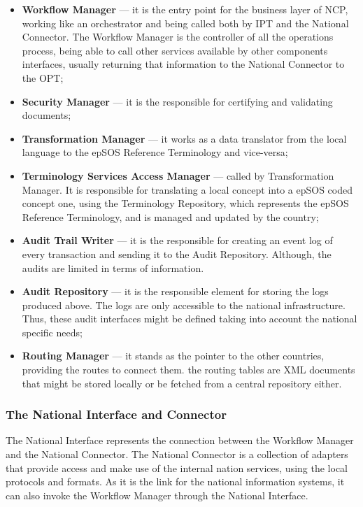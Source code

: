 \begin{itemize}
\item \textbf{Workflow Manager} --- it is the entry point for the business layer of NCP, working like an orchestrator and being called both by IPT and the National Connector. The Workflow Manager is the controller of all the operations process, being able to call other services available by other components interfaces, usually returning that information to the National Connector to the OPT;
\item \textbf{Security Manager} --- it is the responsible for certifying and validating documents;
\item \textbf{Transformation Manager} --- it works as a data translator from the local language to the epSOS Reference Terminology and vice-versa;
\item \textbf{Terminology Services Access Manager} --- called by Transformation Manager. It is responsible for translating a local concept into a epSOS coded concept one, using the Terminology Repository, which represents the epSOS Reference Terminology, and is managed and updated by the country;
\item \textbf{Audit Trail Writer} --- it is the responsible for creating an event log of every transaction and sending it to the Audit Repository. Although, the audits are limited in terms of information.
\item \textbf{Audit Repository} --- it is the responsible element for storing the logs produced above. The logs are only accessible to the national infrastructure. Thus, these audit interfaces might be defined taking into account the national specific needs;
\item \textbf{Routing Manager} --- it stands as the pointer to the other countries, providing the routes to connect them. the routing tables are XML documents that might be stored locally or be fetched from a central repository either. 
\end{itemize}

\subsubsection{The National Interface and Connector}
The National Interface represents the connection between the Workflow Manager and the National Connector. The National Connector is a collection of adapters that provide access and make use of the internal nation services, using the local protocols and formats. As it is the link for the national information systems, it can also invoke the Workflow Manager through the National Interface.
